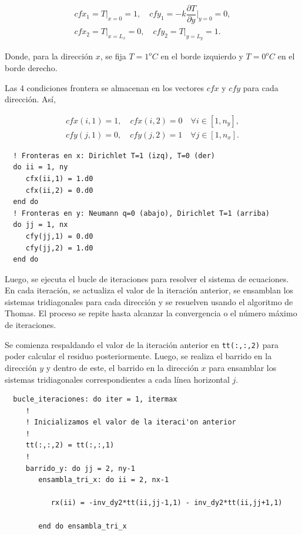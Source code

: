 \documentclass[11pt,a4paper]{article}
\begin{document}
\begin{equation}
  \begin{array}{l}
    cfx_1 = T\big|_{x=0} = 1, \quad
    cfy_1 = -k \dfrac{\partial T}{\partial y}\bigg|_{y=0} = 0, \\
    cfx_{2} = T\big|_{x=L_x} = 0, \quad
    cfy_{2} = T\big|_{y=L_y} = 1.
  \end{array}
\end{equation}

Donde, para la direcci\'on $x$, se fija $T=1^{o}C$ en el borde izquierdo y
$T=0^{o}C$ en el borde derecho.

\medskip

Las 4 condiciones frontera se almacenan en los vectores \texttt{$cfx$} 
y \texttt{$cfy$} para cada direcci\'on. As\'i,

\begin{equation}
  \begin{array}{l}
    cfx(i,1) = 1, \quad cfx(i,2) = 0 \quad \forall i \in [1, n_y], \\
    cfy(j,1) = 0, \quad cfy(j,2) = 1 \quad \forall j \in [1, n_x].
  \end{array}
\end{equation}

\begin{verbatim}
  ! Fronteras en x: Dirichlet T=1 (izq), T=0 (der)
  do ii = 1, ny
     cfx(ii,1) = 1.d0
     cfx(ii,2) = 0.d0
  end do
  ! Fronteras en y: Neumann q=0 (abajo), Dirichlet T=1 (arriba)
  do jj = 1, nx
     cfy(jj,1) = 0.d0
     cfy(jj,2) = 1.d0
  end do
\end{verbatim}

Luego, se ejecuta el bucle de iteraciones para resolver el sistema de 
ecuaciones. En cada iteración, se actualiza el valor de la iteración anterior, 
se ensamblan los sistemas tridiagonales para cada dirección y se resuelven 
usando el algoritmo de Thomas. El proceso se repite hasta alcanzar la 
convergencia o el número máximo de iteraciones.

\medskip

Se  comienza respaldando el valor de la iteraci\'on anterior en 
\texttt{tt(:,:,2)} para poder calcular el residuo posteriormente. Luego, se 
realiza el barrido en la direcci\'on $y$ y dentro de este, el barrido en la 
direcci\'on $x$ para ensamblar los sistemas tridiagonales correspondientes a 
cada línea horizontal $j$.

\begin{verbatim}
  bucle_iteraciones: do iter = 1, itermax
     !
     ! Inicializamos el valor de la iteraci'on anterior
     !
     tt(:,:,2) = tt(:,:,1)
     !
     barrido_y: do jj = 2, ny-1
        ensambla_tri_x: do ii = 2, nx-1

           rx(ii) = -inv_dy2*tt(ii,jj-1,1) - inv_dy2*tt(ii,jj+1,1)
           
        end do ensambla_tri_x
\end{verbatim}
\end{document}
